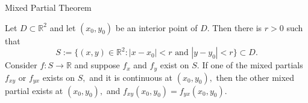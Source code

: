 \documentclass[handout, aspectratio=169]{beamer}
\begin{document}
\begin{frame}{Mixed Partial Theorem} 
	\begin{theorem} 
		Let $D \subset \mathbb{R}^2$ and let $(x_0, y_0)$ be an interior point of $D.$ Then there is $r > 0$ such that 
		\[S := \{(x, y) \in \mathbb{R}^2 : |x - x_0| < r \text{ and } |y - y_0| < r\} \subset D.\]
		Consider $f:S\to \mathbb{R}$ and suppose $f_x$ and $f_y$ exist on $S.$ If one of the mixed partials $f_{xy}$ or $f_{yx}$ exists on $S,$ and it is continuous at $(x_0, y_0),$ then the other mixed partial exists at $(x_0, y_0),$ and $f_{xy}(x_0, y_0) = f_{yx}(x_0, y_0).$
	\end{theorem}
\end{frame}
\end{document}
